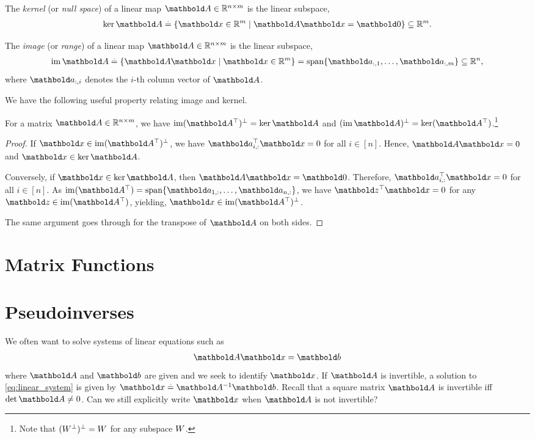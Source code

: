 \begin{defn}[Kernel] The \emph{kernel} (or \emph{null space}) of a linear map $\mA \in \R^{n \times m}$ is the linear subspace, \begin{align}
    \ker\mA \defeq \{\vx \in \R^m \mid \mA\vx = \vZero\}\subseteq \R^m.
\end{align}
\end{defn}
\begin{defn}[Image] The \emph{image} (or \emph{range}) of a linear map $\mA \in \R^{n \times m}$ is the linear subspace, \begin{align}
    \im\mA \defeq \{\mA\vx \mid \vx \in \R^m\} = \vspan\{\va_{:,1}, \dots, \va_{:,m}\} \subseteq \R^n,
\end{align} where $\va_{:,i}$ denotes the $i$-th column vector of $\mA$.
\end{defn}

We have the following useful property relating image and kernel.

\begin{lem}
For a matrix $\mA \in \R^{n \times m}$, we have $\compl{\im(\trans{\mA})} = \ker\mA$ and $\compl{(\im\mA)} = \ker(\trans{\mA})$.\footnote{Note that $(W^\bot)^\bot = W$ for any subspace $W$.}
\end{lem}
\begin{proof}
If $\vx \in \compl{\im(\trans{\mA})}$, we have $\trans{\va_{i,:}}\vx = 0$ for all $i \in [n]$. Hence, $\mA\vx = 0$ and $\vx \in \ker\mA$.

Conversely, if $\vx \in \ker\mA$, then $\mA\vx = \vZero$. Therefore, $\trans{\va_{i,:}}\vx = 0$ for all $i \in [n]$. As $\im(\trans{\mA}) = \vspan\{\va_{1,:}, \dots, \va_{n,:}\}$, we have $\trans{\vz}\vx = 0$ for any $\vz \in \im(\trans{\mA})$, yielding, $\vx \in \compl{\im(\trans{\mA})}$.

The same argument goes through for the transpose of $\mA$ on both sides.
\end{proof}

\section{Matrix Functions}

\section{Pseudoinverses}

We often want to solve systems of linear equations such as \begin{align}
    \mA\vx = \vb \label{eq:linear_system}
\end{align} where $\mA$ and $\vb$ are given and we seek to identify $\vx$. If $\mA$ is invertible, a solution to \cref{eq:linear_system} is given by $\vx \defeq \inv{\mA}\vb$. Recall that a square matrix $\mA$ is invertible iff $\det\mA \neq 0$. Can we still explicitly write $\vx$ when $\mA$ is not invertible?

